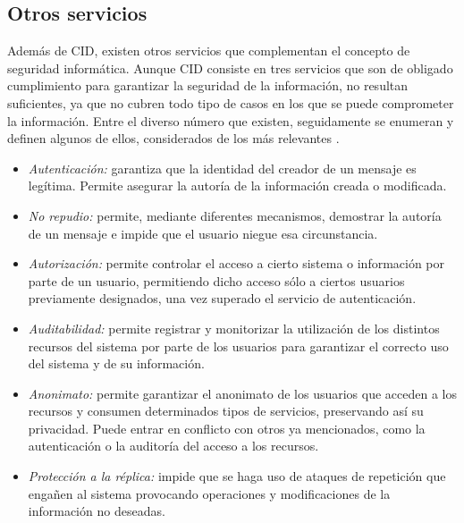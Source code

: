 \subsection{Otros servicios}

Además de CID, existen otros servicios que complementan el concepto de seguridad informática. Aunque CID consiste en tres servicios que son de obligado cumplimiento para garantizar la seguridad de la información, no resultan suficientes, ya que no cubren todo tipo de casos en los que se puede comprometer la información. Entre el diverso número que existen, seguidamente se enumeran y definen algunos de ellos, considerados de los más relevantes \cite{apuntes-isma}.

\begin{itemize}
	\item \emph{Autenticación:} garantiza que la identidad del creador de un mensaje es legítima. Permite asegurar la autoría de la información creada o modificada.
	\item \emph{No repudio:} permite, mediante diferentes mecanismos, demostrar la autoría de un mensaje e impide que el usuario niegue esa circunstancia.
	\item \emph{Autorización:} permite controlar el acceso a cierto sistema o información por parte de un usuario, permitiendo dicho acceso sólo a ciertos usuarios previamente designados, una vez superado el servicio de autenticación. 
	\item \emph{Auditabilidad:} permite registrar y monitorizar la utilización de los distintos recursos del sistema por parte de los usuarios para garantizar el correcto uso del sistema y de su información.
	\item \emph{Anonimato:} permite garantizar el anonimato de los usuarios que acceden a los recursos y consumen determinados tipos de servicios, preservando así su privacidad. Puede entrar en conflicto con otros ya mencionados, como la autenticación o la auditoría del acceso a los recursos.
	\item \emph{Protección a la réplica:} impide que se haga uso de ataques de repetición que engañen al sistema provocando operaciones y modificaciones de la información no deseadas.
\end{itemize}
